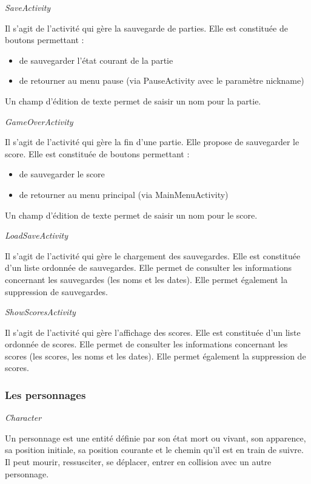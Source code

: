 \documentclass{article}
\begin{document}
\medskip

\textit{SaveActivity}

Il s’agit de l’activité qui gère la sauvegarde de parties. Elle est constituée de boutons permettant :
\begin{itemize}
\item de sauvegarder l’état courant de la partie
\item de retourner au menu pause (via PauseActivity avec le paramètre nickname)
\end{itemize}
Un champ d'édition de texte permet de saisir un nom pour la partie.

\medskip

\textit{GameOverActivity}

Il s’agit de l’activité qui gère la fin d’une partie. Elle propose de sauvegarder le score. Elle est constituée de boutons permettant :
\begin{itemize}
\item de sauvegarder le score
\item de retourner au menu principal (via MainMenuActivity)
\end{itemize}
Un champ d'édition de texte permet de saisir un nom pour le score.

\medskip

\textit{LoadSaveActivity}

Il s’agit de l’activité qui gère le chargement des sauvegardes. Elle est constituée d'un liste ordonnée de sauvegardes. Elle permet de consulter les informations concernant les sauvegardes (les noms et les dates). Elle permet également la suppression de sauvegardes.

\medskip

\textit{ShowScoresActivity}

Il s’agit de l’activité qui gère l’affichage des scores. Elle est constituée d'un liste ordonnée de scores. Elle permet de consulter les informations concernant les scores (les scores, les noms et les dates). Elle permet également la suppression de scores.

\subsubsection{Les personnages}

\textit{Character}

Un personnage est une entité définie par son état mort ou vivant, son apparence, sa position initiale, sa position courante et le chemin qu’il est en train de suivre. Il peut mourir, ressusciter, se déplacer, entrer en collision avec un autre personnage.
\end{document}
